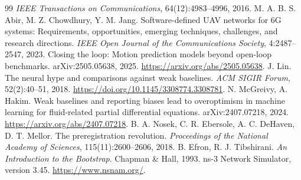 \documentclass[11pt,a4paper]{article}
\begin{document}
\begin{thebibliography}{99}
\textit{IEEE Transactions on Communications}, 64(12):4983--4996, 2016.
 M. A. B. S. Abir, M. Z. Chowdhury, Y. M. Jang.
Software-defined UAV networks for 6G systems: Requirements, opportunities,
emerging techniques, challenges, and research directions.
\textit{IEEE Open Journal of the Communications Society}, 4:2487--2547, 2023.
 Closing the loop: Motion prediction models beyond
open-loop benchmarks. arXiv:2505.05638, 2025.
\url{https://arxiv.org/abs/2505.05638}.
 J. Lin.
The neural hype and comparisons against weak baselines.
\textit{ACM SIGIR Forum}, 52(2):40--51, 2018.
\url{https://doi.org/10.1145/3308774.3308781}.
 N. McGreivy, A. Hakim.
Weak baselines and reporting biases lead to overoptimism in machine learning
for fluid-related partial differential equations.
arXiv:2407.07218, 2024. \url{https://arxiv.org/abs/2407.07218}.
 B. A. Nosek, C. R. Ebersole, A. C. DeHaven, D. T. Mellor.
The preregistration revolution.
\textit{Proceedings of the National Academy of Sciences}, 115(11):2600--2606, 2018.
 B. Efron, R. J. Tibshirani.
\textit{An Introduction to the Bootstrap}. Chapman \& Hall, 1993.
 ns-3 Network Simulator, version 3.45. \url{https://www.nsnam.org/}.
\end{thebibliography}
\end{document}
